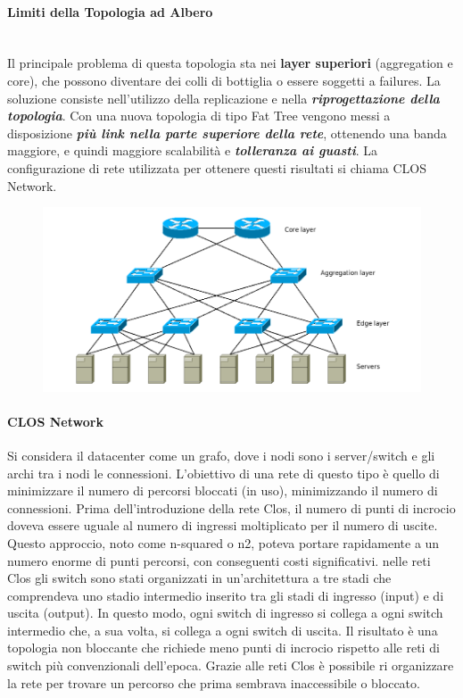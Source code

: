 \documentclass{article}
\begin{document}
		\paragraph{Limiti della Topologia ad
		Albero}\label{limiti-della-topologia-ad-albero}\mbox{}\\
		Il principale problema di questa topologia sta nei \textbf{layer
		superiori} (aggregation e core), che possono diventare dei
		colli di bottiglia o essere soggetti a
		failures. La soluzione consiste nell'utilizzo
		della replicazione e nella \textbf{\emph{riprogettazione della
		topologia}}. Con una nuova topologia di tipo Fat Tree
		vengono messi a disposizione \textbf{\emph{più link nella parte
		superiore della rete}}, ottenendo una banda maggiore, e
		quindi maggiore scalabilità e \textbf{\emph{tolleranza
		ai guasti}}. La configurazione di rete utilizzata per ottenere
		questi risultati si chiama CLOS Network.\\
		\begin{figure}[ht]
			\centering
			\includegraphics[width=0.7\linewidth]{SAC_B7_clos}
			\label{fig:sacb7clos}
		\end{figure}
		
		\paragraph{CLOS Network}
		Si considera il datacenter come
		un grafo, dove i nodi sono i server/switch e gli
		archi tra i nodi le connessioni. L'obiettivo di una rete di
		questo tipo è quello di minimizzare il numero di percorsi
		bloccati (in uso), minimizzando il numero di
		connessioni. Prima dell'introduzione della rete Clos, il numero di punti di incrocio doveva essere uguale al numero di ingressi moltiplicato per il numero di uscite. Questo approccio, noto come n-squared o n2, poteva portare rapidamente a un numero enorme di punti percorsi, con conseguenti costi significativi. nelle reti Clos gli switch sono stati organizzati in un'architettura a tre stadi che comprendeva uno stadio intermedio inserito tra gli stadi di ingresso (input) e di uscita (output). In questo modo, ogni switch di ingresso si collega a ogni switch intermedio che, a sua volta, si collega a ogni switch di uscita. Il risultato è una topologia non bloccante che richiede meno punti di incrocio rispetto alle reti di switch più convenzionali dell'epoca. Grazie alle reti Clos è possibile ri organizzare la rete per trovare un percorso che prima sembrava inaccessibile o bloccato. 
		
\end{document}

